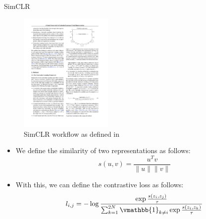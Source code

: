 \documentclass[xcolor=pdftex,dvipsnames,table]{beamer}
\begin{document}
\begin{frame}{SimCLR \cite{Chen2020}}
\begin{figure}[htb]
   \centering
   \includegraphics[width=0.4\textwidth]{../graphics/sim_clr.pdf}
   \caption{SimCLR workflow as defined in \cite{Chen2020}}
\end{figure}
\begin{itemize}
\item We define the similarity of two representations as follows:
\begin{equation}
s(u,v) = \frac{u^Tv}{\|u\|\|v\|}
\end{equation}
\item With this, we can define the contrastive loss as follows:
 \begin{equation}
 l_{i,j} = -\log \frac{\exp \frac{s(z_i, z_j)} {\tau}} {\sum_{k=1}^{2N}\vmathbb{1}_{k\neq i}\exp \frac{s(z_i, z_k)}{\tau} } 
\end{equation}
\end{itemize}
\end{frame}
\end{document}
